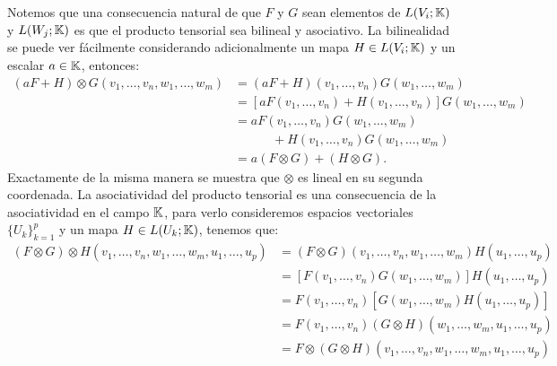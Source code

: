 Notemos que una consecuencia natural de que $F$ y $G$ sean elementos de $L(V_i; \mathbb{K})$ y $L(W_j; \mathbb{K})$ es que el producto tensorial sea bilineal y asociativo. La bilinealidad se puede ver fácilmente considerando adicionalmente un mapa $H \in L(V_i;\mathbb{K})$ y un escalar $a \in \mathbb{K}$, entonces:
\begin{align*}
	(aF + H) \otimes G (v_1, \ldots, v_n, w_1, \ldots, w_m)
	 & =
	(aF + H) (v_1,\ldots,v_n) G(w_1,\ldots, w_m) \\
	 & =
	\left[aF (v_1,\ldots, v_n) +  H(v_1,\ldots,v_n) \right]
	G(w_1,\ldots, w_m)                           \\
	 & =
	aF(v_1,\ldots,v_n)G(w_1,\ldots,w_m)
	\\ &\quad\quad\quad + H(v_1,\ldots,v_n)G(w_1,\ldots,w_m)\\
	 & =
	a(F \otimes G) + (H \otimes G).
\end{align*}
Exactamente de la misma manera se muestra que $\otimes$ es lineal en su segunda coordenada. La asociatividad del producto tensorial es una consecuencia de la asociatividad en el campo $\mathbb{K}$, para verlo consideremos espacios vectoriales $\{U_k\}_{k=1}^{p}$ y un mapa $H \in L(U_k;\mathbb{K})$, tenemos que:
\begin{align*}
	(F \otimes G) \otimes H
	(v_1, \ldots, v_n, w_1, \ldots, w_m, u_1, \ldots, u_p)
	 & =
	(F \otimes G) (v_1, \ldots, v_n, w_1, \ldots, w_m) H (u_1, \ldots, u_p) \\
	 & =
	\left[F(v_1, \ldots, v_n)G(w_1, \ldots, w_m)\right]
	H(u_1, \ldots, u_p)                                                     \\
	 & =
	F(v_1, \ldots, v_n)
	\left[G(w_1, \ldots, w_m)H(u_1, \ldots, u_p)\right]                     \\
	 & =
	F(v_1,\ldots,v_n)(G \otimes H)(w_1,\ldots,w_m,u_1,\ldots,u_p)           \\
  &=
  F \otimes (G \otimes H) 
	(v_1, \ldots, v_n, w_1, \ldots, w_m, u_1, \ldots, u_p)
\end{align*}
